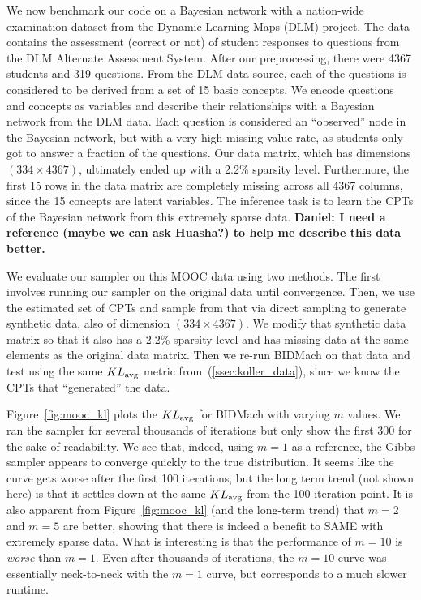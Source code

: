 \documentclass{article} %
\begin{document}
We now benchmark our code on a Bayesian network with a nation-wide examination dataset from the
Dynamic Learning Maps (DLM) project. The data contains the assessment (correct or not) of student
responses to questions from the DLM Alternate Assessment System. After our preprocessing, there were
4367 students and 319 questions. From the DLM data source, each of the questions is considered to be
derived from a set of 15 basic concepts. We encode questions and concepts as variables and describe
their relationships with a Bayesian network from the DLM data. Each question is considered an
``observed'' node in the Bayesian network, but with a very high missing value rate, as students only
got to answer a fraction of the questions.  Our data matrix, which has dimensions $(334\times
4367)$, ultimately ended up with a 2.2\% sparsity level. Furthermore, the first 15 rows in the data
matrix are completely missing across all 4367 columns, since the 15 concepts are latent variables. The
inference task is to learn the CPTs of the Bayesian network from this extremely sparse data.
\textbf{Daniel: I need a reference (maybe we can ask Huasha?) to help me describe this data better.}

We evaluate our sampler on this MOOC data using two methods. The first involves running our sampler
on the original data until convergence. Then, we use the estimated set of CPTs and sample from that
via direct sampling to generate synthetic data, also of dimension $(334 \times 4367)$. We modify
that synthetic data matrix so that it also has a 2.2\% sparsity level and has missing data at the
same elements as the original data matrix. Then we re-run BIDMach on that data and test using the
same $KL_{\rm avg}$ metric from~(\ref{ssec:koller_data}), since we know the CPTs that ``generated''
the data.

Figure~\ref{fig:mooc_kl} plots the $KL_{\rm avg}$ for BIDMach with varying $m$ values. We ran the
sampler for several thousands of iterations but only show the first 300 for the sake of readability.
We see that, indeed, using $m=1$ as a reference, the Gibbs sampler appears to converge quickly to
the true distribution. It seems like the curve gets worse after the first 100 iterations, but
the long term trend (not shown here) is that it settles down at the same $KL_{\rm avg}$ from the 100
iteration point. It is also apparent from Figure~\ref{fig:mooc_kl} (and the long-term trend) that
$m=2$ and $m=5$ are better, showing that there is indeed a benefit to SAME with extremely sparse
data. What is interesting is that the performance of $m=10$ is \emph{worse} than $m=1$. Even after
thousands of iterations, the $m=10$ curve was essentially neck-to-neck with the $m=1$ curve, but
corresponds to a much slower runtime.
\end{document}
